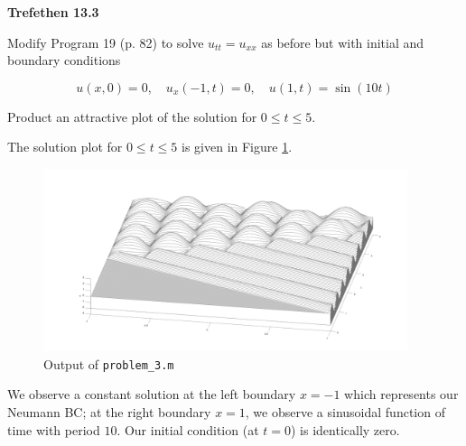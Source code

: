 \textbf{Trefethen 13.3}

Modify Program 19 (p. 82) to solve $u_{tt} = u_{xx}$ as before but with initial and boundary conditions

$$
u(x, 0) = 0, \quad u_x(-1, t) = 0, \quad u(1, t) = \sin{(10t)}
$$

Product an attractive plot of the solution for $0 \le t \le 5$.

\begin{solution}
    The solution plot for $0 \le t \le 5$ is given in Figure \ref{fig:problem_3}.

    \begin{figure}[h]
        \includegraphics*[width=0.95\textwidth]{problem_3.png}
        \caption{Output of \texttt{problem\_3.m}}
        \label{fig:problem_3}
    \end{figure}

    We observe a constant solution at the left boundary $x = -1$ which represents our Neumann BC; at the
    right boundary $x = 1$, we observe a sinusoidal function of time with period $10$. Our initial condition 
    (at $t = 0$) is identically zero.
    \ \\
\end{solution}